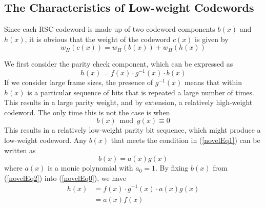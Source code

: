 \subsection{The Characteristics of Low-weight Codewords}
Since each RSC codeword is made up of two codeword components $b(x)$ and $h(x)$, it is obvious that the weight of the codeword $c(x)$ is given by 
\begin{equation}
w_H(c(x))=w_H(b(x)) + w_H(h(x))
\label{novelEq-1}
\end{equation} 

We first consider the parity check component, which can be expressed as 
\begin{equation}
h(x) =f(x)\cdot g^{-1}(x)\cdot b(x)
\label{novelEq0}
\end{equation}
If we consider large frame sizes, the presence of $g^{-1}(x)$ means that within $h(x)$ is a particular sequence of bits that is repeated a large number of times. This results in a large parity weight, and by extension, a relatively high-weight codeword. The only time this is not the case is when
\begin{equation}
b(x) \bmod g(x) \equiv 0
\label{novelEq1}
\end{equation}
This results in a relatively low-weight parity bit sequence, which might produce a low-weight codeword. Any $b(x)$ that meets the condition in (\ref{novelEq1}) can be written as 
\begin{equation}
b(x) =a(x)g(x)
\label{novelEq2}
\end{equation}
where $a(x)$ is a monic polynomial with $a_0=1$.
By fixing $b(x)$ from (\ref{novelEq2}) into (\ref{novelEq0}), we have 
\begin{equation}
\begin{split}
h(x)&=f(x)\cdot g^{-1}(x)\cdot a(x)g(x)\\
&=a(x)f(x)
\end{split}
\label{novelEq3}
\end{equation}

